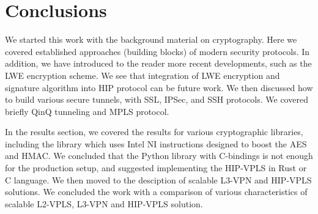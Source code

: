 \chapter{Conclusions}

We started this work with the background material on cryptography. Here we covered
established approaches (building blocks) of modern security protocols. In addition, we 
have introduced to the reader more recent developments, such as the LWE encryption scheme.
We see that integration of LWE encryption and signature algorithm into HIP protocol 
can be future work. We then discussed how to build various secure tunnels, \eg with 
SSL, IPSec, and SSH protocols. We covered briefly QinQ tunneling and MPLS protocol.

In the results section, we covered the results for various cryptographic libraries,
including the library which uses Intel NI instructions designed to boost the AES and 
HMAC. We concluded that the Python library with C-bindings is not enough for the 
production setup, and suggested implementing the HIP-VPLS in Rust or C language.
We then moved to the desciption of scalable L3-VPN and HIP-VPLS solutions. We concluded 
the work with a comparison of various characteristics of scalable L2-VPLS, L3-VPN and 
HIP-VPLS solution. 


